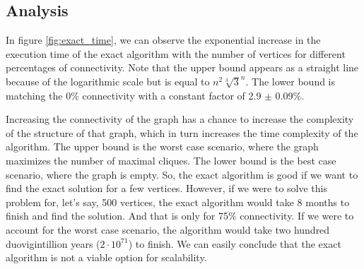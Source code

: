 \subsection{Analysis}

In figure \ref{fig:exact_time}, we can observe the exponential increase in the
execution time of the exact algorithm with the number of vertices for different
percentages of connectivity. Note that the upper bound appears as a straight
line because of the logarithmic scale but is equal to $n^2\sqrt[3]{3}^n$. The
lower bound is matching the 0\% connectivity with a constant factor of
2.9 $\pm$ 0.09\%. \bigskip

Increasing the connectivity of the graph has a chance to increase the complexity
of the structure of that graph, which in turn increases the time complexity of the
algorithm. The upper bound is the worst case scenario, where the graph maximizes
the number of maximal cliques. The lower bound is the best case scenario, where
the graph is empty.
\newpage
So, the exact algorithm is good if we want to find the exact solution for a few 
vertices. 
However, if we were to solve this problem for, let's say, 500 vertices,
the exact algorithm would take 8 months to finish and find the solution. And that is
only for 75\% connectivity. If we were to account for the worst case scenario,
the algorithm would take two hundred duovigintillion years ($2\cdot10^{71}$) 
to finish. We can easily conclude that the exact algorithm is not a viable option
for scalability.